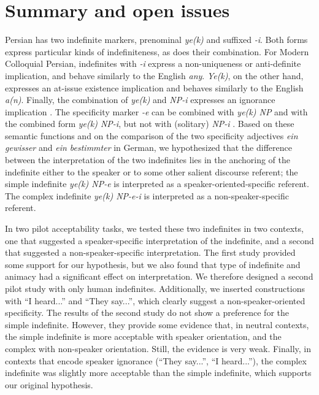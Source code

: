 \documentclass[output=paper]{langsci/langscibook}
\begin{document}
\section{Summary and open issues}\label{4sec:6}

{
Persian has two indefinite markers, prenominal {\emph{ye(k)}} and suffixed {\emph{-i}}. Both forms express particular kinds of indefiniteness, as does their combination. For Modern Colloquial Persian, indefinites with {\emph{-i}} express a non-uniqueness or anti-definite implication, and behave similarly to the English {\emph{any}}. {\emph{Ye(k)}}, on the other hand, expresses an at-issue existence implication and behaves similarly to the English {\emph{a(n)}}. Finally, the combination of {\emph{ye(k)}} and {\emph{NP-i}} expresses an ignorance implication \citep{jasbi:16}. The specificity marker {\emph{-e}} can be combined with {\emph{ye(k) NP}} and with the combined form {\emph{ye(k) NP-i}}, but not with (solitary) {\emph{NP-i}} \citep{windfuhr:79,ghomeshi:03}. Based on these semantic functions and on the comparison of the two specificity adjectives {\emph{ein gewisser}} and {\emph{ein bestimmter}} in German, we hypothesized that the difference between the interpretation of the two indefinites lies in the anchoring of the indefinite either to the speaker or to some other salient discourse referent; the simple indefinite {\emph{ye(k) NP-e}} is interpreted as a speaker-oriented-specific referent. The complex indefinite {\emph{ye(k) NP-e-i}} is interpreted as a non-speaker-specific referent. 
}

{
In two pilot acceptability tasks, we tested these two indefinites in two contexts, one that suggested a speaker-specific interpretation of the indefinite, and a second that suggested a non-speaker-specific interpretation. The first study provided some support for our hypothesis, but we also found that type of indefinite and animacy had a significant effect on interpretation. We therefore designed a second pilot study with only human indefinites. Additionally, we inserted constructions with ``I heard...'' and ``They say...'', which clearly suggest a non-speaker-oriented specificity. The results of the second study do not show a preference for the simple indefinite. However, they provide some evidence that, in neutral contexts, the simple indefinite is more acceptable with speaker orientation, and the complex with non-speaker orientation. Still, the evidence is very weak. Finally, in contexts that encode speaker ignorance (``They say...'', ``I heard...''), the complex indefinite was slightly more acceptable than the simple indefinite, which supports our original hypothesis.
}
\end{document}
